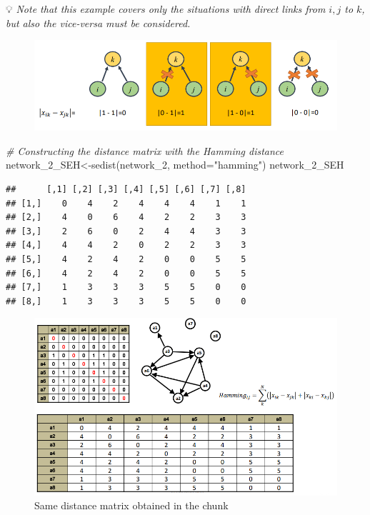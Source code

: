 \documentclass[
  notitlepage,
  onecolumn,
  openany]{book}
\newenvironment{Shaded}{\begin{snugshade}}{\end{snugshade}}
\newcommand{\AttributeTok}[1]{\textcolor[rgb]{0.77,0.63,0.00}{#1}}
\newcommand{\CommentTok}[1]{\textcolor[rgb]{0.56,0.35,0.01}{\textit{#1}}}
\newcommand{\FunctionTok}[1]{\textcolor[rgb]{0.00,0.00,0.00}{#1}}
\newcommand{\NormalTok}[1]{#1}
\newcommand{\OtherTok}[1]{\textcolor[rgb]{0.56,0.35,0.01}{#1}}
\newcommand{\StringTok}[1]{\textcolor[rgb]{0.31,0.60,0.02}{#1}}
\begin{document}
💡 \emph{Note that this example covers only the situations with direct links from \(i,j\) to \(k\), but also the vice-versa must be considered.}

\begin{figure}[h!]

{\centering \includegraphics[width=0.7\linewidth]{images/11-Subgroups and Structural Equivalence/Untitled 6} 

}

\end{figure}

\begin{Shaded}
\begin{Highlighting}[]
\CommentTok{\# Constructing the distance matrix with the Hamming distance}
\NormalTok{network\_2\_SEH}\OtherTok{\textless{}{-}}\FunctionTok{sedist}\NormalTok{(network\_2, }\AttributeTok{method=}\StringTok{"hamming"}\NormalTok{)}
\NormalTok{network\_2\_SEH }
\end{Highlighting}
\end{Shaded}

\begin{verbatim}
##      [,1] [,2] [,3] [,4] [,5] [,6] [,7] [,8]
## [1,]    0    4    2    4    4    4    1    1
## [2,]    4    0    6    4    2    2    3    3
## [3,]    2    6    0    2    4    4    3    3
## [4,]    4    4    2    0    2    2    3    3
## [5,]    4    2    4    2    0    0    5    5
## [6,]    4    2    4    2    0    0    5    5
## [7,]    1    3    3    3    5    5    0    0
## [8,]    1    3    3    3    5    5    0    0
\end{verbatim}

\begin{figure}[h!]

{\centering \includegraphics[width=0.8\linewidth]{images/11-Subgroups and Structural Equivalence/Untitled 7} 

}

\caption{Same distance matrix obtained in the chunk}\label{fig:unnamed-chunk-87}
\end{figure}
\end{document}
